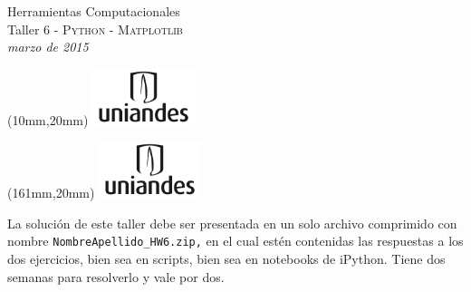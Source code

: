 \documentclass[11pt,letterpaper]{exam}
\begin{document}
\begin{center}
{\Large Herramientas Computacionales} \\
Taller 6 - \textsc{Python - Matplotlib} \\
{\small \it marzo de 2015}
\end{center}

\begin{textblock*}{40mm}(10mm,20mm)
  \includegraphics[width=3cm]{logoUniandes.pdf}
\end{textblock*}

\begin{textblock*}{40mm}(161mm,20mm)
  \includegraphics[width=3cm]{logoUniandes.pdf}
\end{textblock*}

\vspace{1cm}

La solución de este taller debe ser presentada en un solo archivo comprimido con nombre \verb+NombreApellido_HW6.zip,+ en el cual estén contenidas las respuestas a los dos ejercicios, bien sea en scripts, bien sea en notebooks de iPython. Tiene dos semanas para resolverlo y vale por dos.
\end{document}
